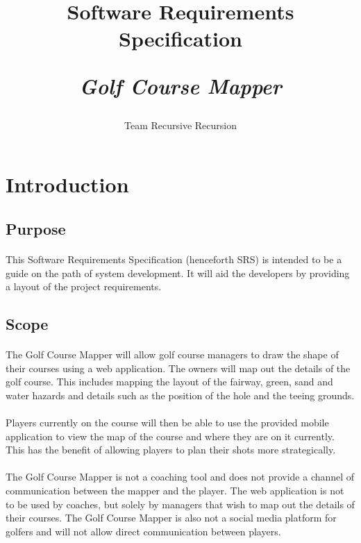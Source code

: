 \documentclass{article}
\title{
    Software Requirements Specification\\
    \begin{large}
        \textit{Golf Course Mapper}
    \end{large}
}
\date{
    \begin{small}
        \today
    \end{small}
}
\author{
    Team Recursive Recursion
}
\begin{document}
    \maketitle
    \newpage

    \section{Introduction}

    \subsection{Purpose}

    \paragraph{}
    This Software Requirements Specification (henceforth SRS) is intended to be
    a guide on the path of system development. It will aid the developers by
    providing a layout of the project requirements.

    \subsection{Scope}

    \paragraph{}
    The Golf Course Mapper will allow golf course managers to draw the shape of
    their courses using a web application. The owners will map out the details
    of the golf course. This includes mapping the layout of the fairway, green,
    sand and water hazards and details such as the position of the hole and the
    teeing grounds.

    \paragraph{}
    Players currently on the course will then be able to use the provided mobile
    application to view the map of the course and where they are on it
    currently. This has the benefit of allowing players to plan their shots more
    strategically.

    \paragraph{}
    The Golf Course Mapper is not a coaching tool and does not provide a channel
    of communication between the mapper and the player. The web application is
    not to be used by coaches, but solely by managers that wish to map out the
    details of their courses. The Golf Course Mapper is also not a social media
    platform for golfers and will not allow direct communication between
    players.
\end{document}
